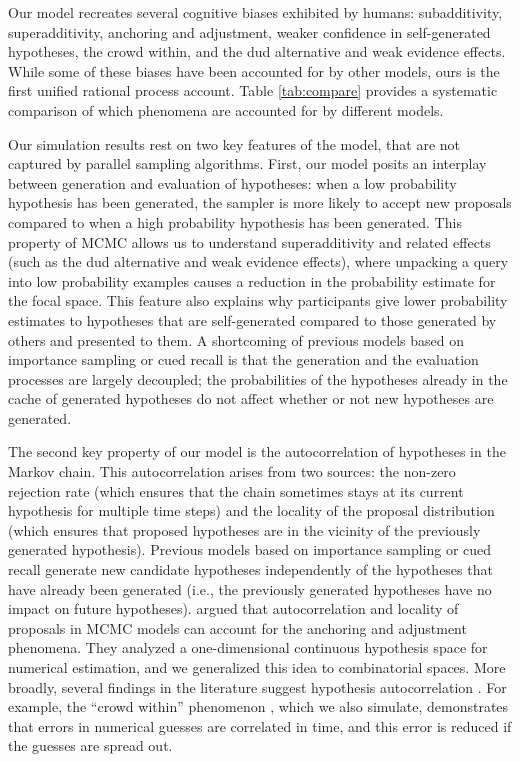 Our model recreates several cognitive biases exhibited by humans: subadditivity, superadditivity, anchoring and adjustment, weaker confidence in self-generated hypotheses, the crowd within, and the dud alternative and weak evidence effects. While some of these biases have been accounted for by other models, ours is the first unified rational process account. Table \ref{tab:compare} provides a systematic comparison of which phenomena are accounted for by different models.

Our simulation results rest on two key features of the model, that are not captured by parallel sampling algorithms. First, our model posits an interplay between generation and evaluation of hypotheses: when a low probability hypothesis has been generated, the sampler is more likely to accept new proposals compared to when a high probability hypothesis has been generated. This property of MCMC allows us to understand superadditivity and related effects (such as the dud alternative and weak evidence effects), where unpacking a query into low probability examples causes a reduction in the probability estimate for the focal space. This feature also explains why participants give lower probability estimates to hypotheses that are self-generated compared to those generated by others and presented to them. A shortcoming of previous models based on importance sampling \citep{shi10} or cued recall \citep{Thomas2008} is that the generation and the evaluation processes are largely decoupled; the probabilities of the hypotheses already in the cache of generated hypotheses do not affect whether or not new hypotheses are generated.

The second key property of our model is the autocorrelation of hypotheses in the Markov chain. This autocorrelation arises from two sources: the non-zero rejection rate (which ensures that the chain sometimes stays at its current hypothesis for multiple time steps) and the locality of the proposal distribution (which ensures that proposed hypotheses are in the vicinity of the previously generated hypothesis). Previous models based on importance sampling or cued recall generate new candidate hypotheses independently of the hypotheses that have already been generated (i.e., the previously generated hypotheses have no impact on future hypotheses). \cite{lieder2017anchoring} argued that autocorrelation and locality of proposals in MCMC models can account for the anchoring and adjustment phenomena. They analyzed a one-dimensional continuous hypothesis space for numerical estimation, and we generalized this idea to combinatorial spaces. More broadly, several findings in the literature suggest hypothesis autocorrelation \citep{multistability,vul08,Bonawitz2014}. For example, the ``crowd within'' phenomenon \citep{vul08}, which we also simulate, demonstrates that errors in numerical guesses are correlated in time, and this error is reduced if the guesses are spread out.

